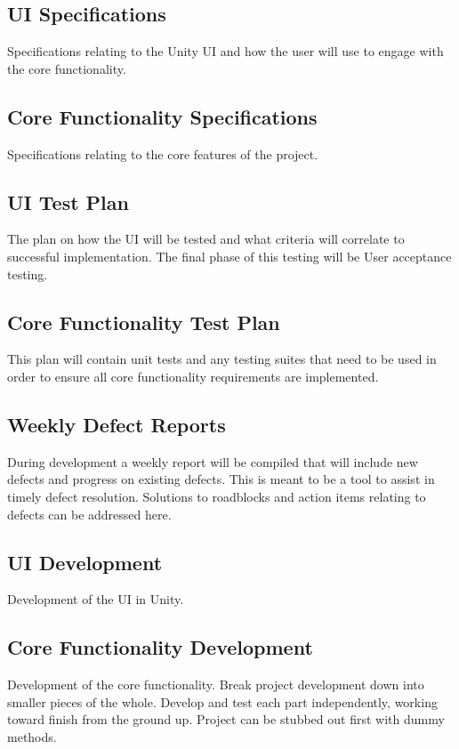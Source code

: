 \documentclass[12pt]{article}
\begin{document}
\subsection{UI Specifications} 
Specifications relating to the Unity UI and how the user will use to engage with the core functionality.  

\subsection{Core Functionality Specifications} 
Specifications relating to the core features of the project.

\subsection{UI Test Plan} 
The plan on how the UI will be tested and what criteria will correlate to successful implementation.  The final phase of this testing will be User acceptance testing.

\subsection{Core Functionality Test Plan} 
This plan will contain unit tests and any testing suites that need to be used in order to ensure all core functionality requirements are implemented.

\subsection{Weekly Defect Reports} 
During development a weekly report will be compiled that will include new defects and progress on existing defects. This is meant to be a tool to assist in timely defect resolution.  Solutions to roadblocks and action items relating to defects can be addressed here.

\subsection{UI Development} 
Development of the UI in Unity.

\subsection{Core Functionality Development} 
Development of the core functionality. Break project development down into smaller pieces of the whole. Develop and test each part independently, working toward finish from the ground up. Project can be stubbed out first with dummy methods.
\end{document}
